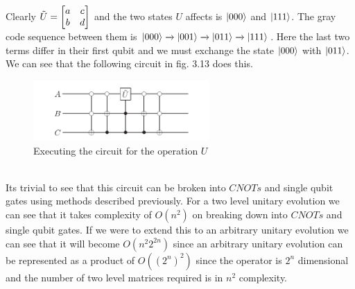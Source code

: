 \documentclass{report}
\begin{document}
Clearly $\Tilde{U} =\begin{bmatrix}a & c\\b & d\end{bmatrix}$ and the two states $U$ affects is $\ket{000}$ and $\ket{111}$. The gray code sequence between them is $\ket{000}\xrightarrow{}\ket{001}\xrightarrow{}\ket{011}\xrightarrow{}\ket{111}$. Here the last two terms differ in their first qubit and we must exchange the state $\ket{000}$ with $\ket{011}$. We can see that the following circuit in fig. 3.13 does this.
\begin{figure}[ht]
\centering
\includegraphics[width = 0.6\textwidth]{images/two level unitary.png}
\caption{Executing the circuit for the operation $U$}
\end{figure}\\
Its trivial to see that this circuit can be broken into $CNOTs$ and single qubit gates using methods described previously. For a two level unitary evolution we can see that it takes complexity of $O(n^2)$ on breaking down into $CNOTs$ and single qubit gates. If we were to extend this to an arbitrary unitary evolution we can see that it will become $O(n^{2}2^{2n})$ since an arbitrary unitary evolution can be represented as a product of $O((2^n)^2)$ since the operator is $2^n$ dimensional and the number of two level matrices required is in $n^2$ complexity.\\
\end{document}
